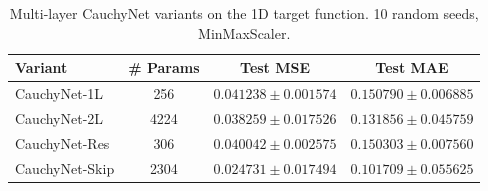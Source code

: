 \begin{table}[ht]\centering
\caption{Multi-layer CauchyNet variants on the 1D target function. 10 random seeds, MinMaxScaler.}
\label{tab:multilayer}
\begin{tabular}{lccc}
\toprule
Variant & \# Params & Test MSE & Test MAE \\
\midrule
CauchyNet-1L & 256 & $0.041238 \pm 0.001574$ & $0.150790 \pm 0.006885$ \\
CauchyNet-2L & 4224 & $0.038259 \pm 0.017526$ & $0.131856 \pm 0.045759$ \\
CauchyNet-Res & 306 & $0.040042 \pm 0.002575$ & $0.150303 \pm 0.007560$ \\
CauchyNet-Skip & 2304 & $0.024731 \pm 0.017494$ & $0.101709 \pm 0.055625$ \\
\bottomrule
\end{tabular}
\end{table}
